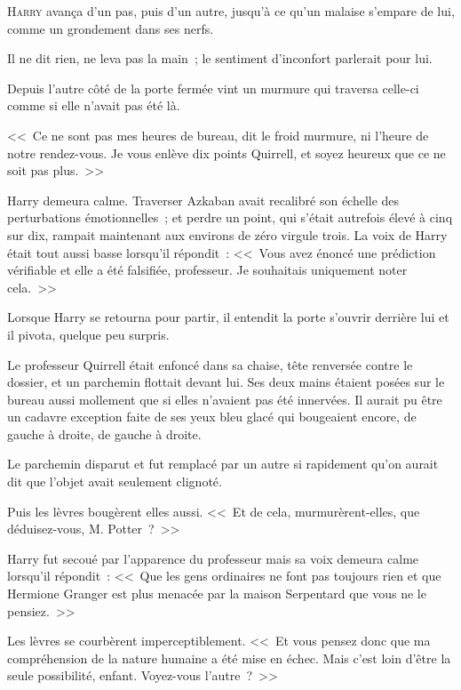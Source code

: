 
\lettrine{H}{arry} avança d'un pas, puis d'un autre, jusqu'à ce qu'un malaise s'empare de lui, comme un grondement dans ses nerfs.

Il ne dit rien, ne leva pas la main~; le sentiment d'inconfort parlerait pour lui.

Depuis l'autre côté de la porte fermée vint un murmure qui traversa celle-ci comme si elle n'avait pas été là.

<<~Ce ne sont pas mes heures de bureau, dit le froid murmure, ni l'heure de notre rendez-vous. Je vous enlève dix points Quirrell, et soyez heureux que ce ne soit pas plus.~>>

Harry demeura calme. Traverser Azkaban avait recalibré son échelle des perturbations émotionnelles~; et perdre un point, qui s'était autrefois élevé à cinq sur dix, rampait maintenant aux environs de zéro virgule trois. La voix de Harry était tout aussi basse lorsqu'il répondit~: <<~Vous avez énoncé une prédiction vérifiable et elle a été falsifiée, professeur. Je souhaitais uniquement noter cela.~>>

Lorsque Harry se retourna pour partir, il entendit la porte s'ouvrir derrière lui et il pivota, quelque peu surpris.

Le professeur Quirrell était enfoncé dans sa chaise, tête renversée contre le dossier, et un parchemin flottait devant lui. Ses deux mains étaient posées sur le bureau aussi mollement que si elles n'avaient pas été innervées. Il aurait pu être un cadavre exception faite de ses yeux bleu glacé qui bougeaient encore, de gauche à droite, de gauche à droite.

Le parchemin disparut et fut remplacé par un autre si rapidement qu'on aurait dit que l'objet avait seulement clignoté.

Puis les lèvres bougèrent elles aussi. <<~Et de cela, murmurèrent-elles, que déduisez-vous, M. Potter~?~>>

Harry fut secoué par l'apparence du professeur mais sa voix demeura calme lorsqu'il répondit~: <<~Que les gens ordinaires ne font pas toujours rien et que Hermione Granger est plus menacée par la maison Serpentard que vous ne le pensiez.~>>

Les lèvres se courbèrent imperceptiblement. <<~Et vous pensez donc que ma compréhension de la nature humaine a été mise en échec. Mais c'est loin d'être la seule possibilité, enfant. Voyez-vous l'autre~?~>>

